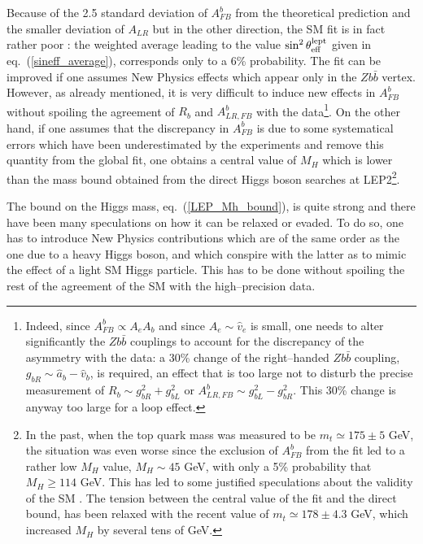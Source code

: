 Because of the 2.5 standard deviation of $A_{FB}^b$ from the theoretical
prediction and the smaller deviation of $A_{LR}$ but in the other direction,
the SM fit is in fact rather poor \cite{Poor-fit}: the weighted average leading
to the value $\sin^2\theta^{\rm lept}_{\rm eff}$ given in
eq.~(\ref{sineff_average}), corresponds only to a 6\% probability.  The fit can
be improved if one assumes New Physics effects which appear only in the
$Zb\bar{b}$ vertex.  However, as already mentioned, it is very difficult to
induce new effects in $A_{FB}^b$ without spoiling the agreement of $R_b$ and
$A_{LR,FB}^b$ with the data\footnote{Indeed, since $A_{FB}^b \propto A_e A_b$
and since $A_e \sim \hat{v}_e$ is small, one needs to alter significantly the
$Zb\bar{b}$ couplings to account for the discrepancy of the asymmetry with the
data: a 30\% change of the right--handed $Zb\bar{b}$ coupling, $g_{bR} \sim 
\hat{a}_b - \hat{v}_b$, is required, an effect that is too large not to disturb
the precise measurement of $R_b \sim  g_{bR}^2+ g_{bL}^2$ or $A^b_{LR,FB} \sim 
g_{bL}^2 - g_{bR}^2$. This 30\% change is anyway too large for a loop effect.}. 
On the other hand, if one assumes that the discrepancy in $A_{FB}^b$ is due to
some systematical errors which have been underestimated by the experiments and
remove this quantity from the global fit, one obtains a central value of $M_H$
which is lower than the mass bound obtained from the direct Higgs
boson searches at LEP2\footnote{In the past, when the top quark mass was
measured to be $m_t \simeq 175 \pm 5$ GeV, the situation was even worse since
the exclusion of $A_{FB}^b$ from the fit led to a rather low $M_H$ value, $M_H
\sim 45$ GeV, with only a 5\% probability that $M_H \geq 114$ GeV. This has led
to some justified speculations about the validity of the SM \cite{Poor-fit}.
The tension between the central value of the fit and the direct bound, has been
relaxed with the recent value of $m_t \simeq 178 \pm 4.3$ GeV, which increased
$M_H$ by several tens of GeV.}.\s

The bound on the Higgs mass, eq.~(\ref{LEP_Mh_bound}), is quite strong and 
there have been many speculations on how it can be relaxed or evaded. To do 
so, one has to introduce New Physics contributions which are of the same order 
as the one due to a heavy Higgs boson, and which conspire with the latter as 
to mimic the effect of a light SM Higgs particle. This has to be done without
spoiling the rest of the agreement of the SM with the high--precision data.\s

